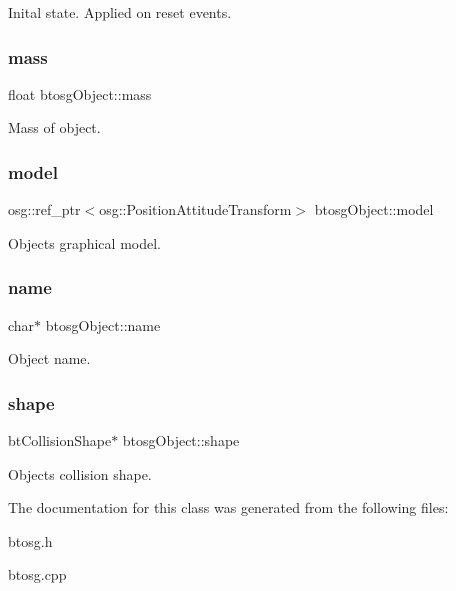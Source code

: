 Inital state. Applied on reset events. 

\mbox{\label{classbtosgObject_a2418bb2194d5e9b0f1c51c84672ba7d1}} 
\subsubsection{\texorpdfstring{mass}{mass}}
{\footnotesize\ttfamily float btosg\+Object\+::mass}



Mass of object. 

\mbox{\label{classbtosgObject_afd15726e7a214212d6d5815f8ac1ac6c}} 
\subsubsection{\texorpdfstring{model}{model}}
{\footnotesize\ttfamily osg\+::ref\+\_\+ptr$<$osg\+::\+Position\+Attitude\+Transform$>$ btosg\+Object\+::model}



Object\textquotesingle{}s graphical model. 

\mbox{\label{classbtosgObject_a12396e1362797a75473a2e833b579cc9}} 
\subsubsection{\texorpdfstring{name}{name}}
{\footnotesize\ttfamily char$\ast$ btosg\+Object\+::name}



Object name. 

\mbox{\label{classbtosgObject_a0f6a8da01cf643c321bffe86e42604b0}} 
\subsubsection{\texorpdfstring{shape}{shape}}
{\footnotesize\ttfamily bt\+Collision\+Shape$\ast$ btosg\+Object\+::shape}



Object\textquotesingle{}s collision shape. 



The documentation for this class was generated from the following files\+:\begin{DoxyCompactItemize}
\item 
btosg.\+h\item 
btosg.\+cpp\end{DoxyCompactItemize}
